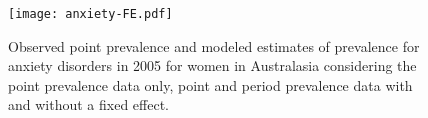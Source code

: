     \begin{figure}[h]
        \begin{center}
            \texttt{[image: anxiety-FE.pdf]}
            \caption{Observed point prevalence and modeled estimates of prevalence for anxiety disorders in 2005 for women in Australasia considering the point prevalence data only, point and period prevalence data with and without a fixed effect.}
            \label{fig:app-anxiety FE}
        \end{center}
    \end{figure}

